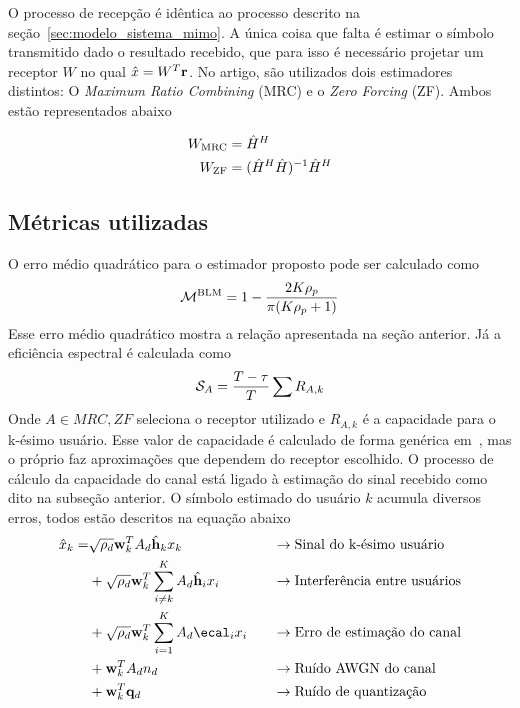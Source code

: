 \documentclass{article}
\begin{document}
	O processo de recepção é idêntica ao processo descrito na seção~\ref{sec:modelo_sistema_mimo}. A única coisa que falta é estimar o símbolo transmitido dado o resultado recebido, que para isso é necessário projetar um receptor $W$ no qual $\hat{x}=W^T\mathbf{r}$. No artigo, são utilizados dois estimadores distintos: O \textit{Maximum Ratio Combining} (MRC) e o \textit{Zero Forcing} (ZF). Ambos estão representados abaixo
	
	\begin{equation}
		\begin{split}
			W_{\text{MRC}} & = \hat{H}^H\\ 
			W_{\text{ZF}}  & = (\hat{H}^H\hat{H})^{-1}\hat{H}^H
		\end{split}
		\label{eq:}
	\end{equation}

	\subsection{Métricas utilizadas}

	O erro médio quadrático para o estimador proposto pode ser calculado como 
	\begin{equation}
		\mathcal{M}^{\text{BLM}} = 1 - \frac{2K\rho_p}{\pi(K\rho_p+1)}
		\label{eq:erro_medio_quadratico_estimador_proposto}
	\end{equation}
	Esse erro médio quadrático mostra a relação apresentada na seção anterior. Já a eficiência espectral é calculada como
	\begin{equation}
		\mathcal{S}_{A} = \frac{T-\tau}{T}\sum{R_{A,k}}
		\label{eq:eficiencia_espectral_estimador_receptor_proposto}
	\end{equation}
	Onde $A\in{MRC,ZF}$ seleciona o receptor utilizado e $R_{A,k}$ é a capacidade para o k-ésimo usuário. Esse valor de capacidade é calculado de forma genérica em~\cite[eq. 42]{li.etal_2017a}, mas o próprio faz aproximações que dependem do receptor escolhido. O processo de cálculo da capacidade do canal está ligado à estimação do sinal recebido como dito na subseção anterior. O símbolo estimado do usuário $k$ acumula diversos erros, todos estão descritos na equação abaixo
	\begin{alignat*}{3}
		\xh_k  = & \sqrt{\rho_d}\wbf^T_k A_d \hbfh_{k} x_k &\;\;\;& \to\text{Sinal do k-ésimo usuário} \\
		& + \sqrt{\rho_d}\wbf^T_k\sum^{K}_{i\neq k}A_d\hbfh_ix_i &\;\;\;& \to\text{Interferência entre usuários} \\
		& + \sqrt{\rho_d}\wbf^T_k\sum^K_{i=1}A_d\ecal_ix_i &\;\;\;& \to\text{Erro de estimação do canal} \\ 
		& + \wbf^T_kA_dn_d &\;\;\;& \to\text{Ruído AWGN do canal} \\ 
		& + \wbf^T_k \qbf_d &\;\;\;& \to\text{Ruído de quantização}
	\end{alignat*}
	\label{eq:}
\end{document}
